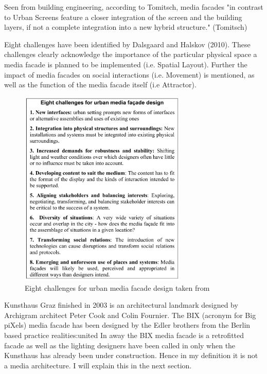 Seen from building engineering, according to Tomitsch, media facades "in contrast to Urban Screens feature a closer integration of the screen and the building layers, if not a complete integration into a new hybrid structure." (Tomitsch)

Eight challenges have been identified by Dalsgaard and Halskov (2010). 
These challenges clearly acknowledge the importance of the particular physical space a media facade is planned to be implemented (i.e. Spatial Layout). Further the impact of media facades on social interactions (i.e. Movement) is mentioned, as well as the function of the media facade itself (i.e Attractor).

\begin{figure}[htp]
\centering
\includegraphics[width=8cm]{Illustrations/8challenges.png}
\caption[Eight challenges for urban media facade design]{Eight challenges for urban media facade design taken from }
\label{8challenges}
\end{figure}


Kunsthaus Graz finished in 2003 is an architectural landmark designed by Archigram architect Peter Cook and Colin Fournier. 
The BIX {(acronym for Big piXels)} media facade has been designed by the Edler brothers from the Berlin based practice realities:united 
In away the BIX media facade is a retrofitted facade as well as the lighting designers have been called in only when the Kunsthaus has already been under construction. Hence in my definition it is not a media architecture. I will explain this in the next section.

